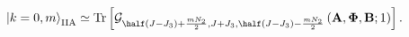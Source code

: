 \begin{equation}
\left| k=0, m \right>_{\mathrm{IIA}} \simeq \mathrm{Tr} \left[ 
            \mathcal{G}_{\half (J-J_3) + \frac{m N_2}{2},J + J_3,\half (J-J_3) - \frac{m N_2}{2}} 
                \left( \mathbf{A}, \mathbf{\Phi}, \mathbf{B}; 1 \right) 
                    \right].
\end{equation}


